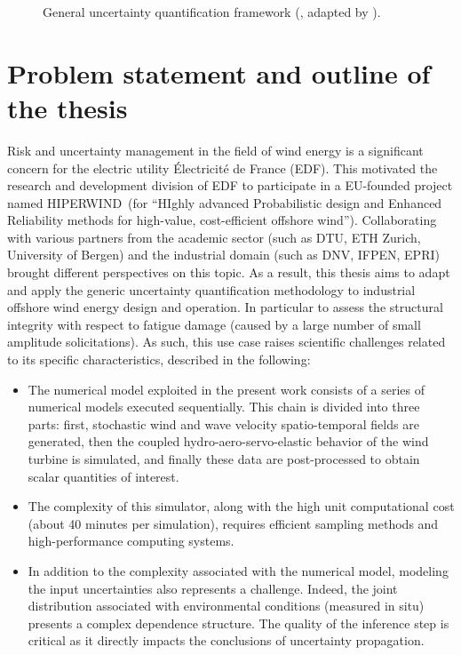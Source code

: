 \begin{figure}[!h]
    \centering
    
    \caption{General uncertainty quantification framework (\citealp{rocquigny_2008}, adapted by \citealp{ajenjo_2023}).}
    \label{fig:UQ_methodo}
\end{figure}


\section*{Problem statement and outline of the thesis}

Risk and uncertainty management in the field of wind energy is a significant concern for the electric utility Électricit\'{e} de France (EDF). 
This motivated the research and development division of EDF to participate in a EU-founded project named HIPERWIND\footnotemark~(for ``HIghly advanced Probabilistic design and Enhanced Reliability methods for high-value, cost-efficient offshore wind''). 
Collaborating with various partners from the academic sector (such as DTU, ETH Zurich, University of Bergen) and the industrial domain (such as DNV, IFPEN, EPRI) brought different perspectives on this topic. 
As a result, this thesis aims to adapt and apply the generic uncertainty quantification methodology to industrial offshore wind energy design and operation. 
In particular to assess the structural integrity with respect to fatigue damage (caused by a large number of small amplitude solicitations). 
As such, this use case raises scientific challenges related to its specific characteristics, described in the following:
\begin{itemize}
    \item The numerical model exploited in the present work consists of a series of numerical models executed sequentially. 
    This chain is divided into three parts: first, stochastic wind and wave velocity spatio-temporal fields are generated, 
    then the coupled hydro-aero-servo-elastic behavior of the wind turbine is simulated, 
    and finally these data are post-processed to obtain scalar quantities of interest. 
    \item The complexity of this simulator, along with the high unit computational cost (about 40 minutes per simulation), requires efficient sampling methods and high-performance computing systems. 
    \item In addition to the complexity associated with the numerical model, modeling the input uncertainties also represents a challenge. 
    Indeed, the joint distribution associated with environmental conditions (measured in situ) presents a complex dependence structure.   
    The quality of the inference step is critical as it directly impacts the conclusions of uncertainty propagation.
\end{itemize}

